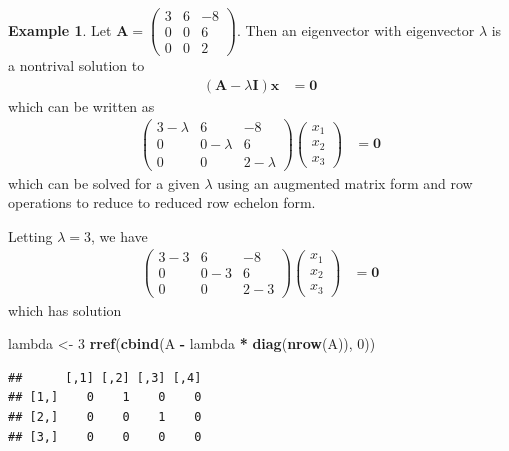 \documentclass[
]{book}
\newenvironment{Shaded}{\begin{snugshade}}{\end{snugshade}}
\newcommand{\DecValTok}[1]{\textcolor[rgb]{0.00,0.00,0.81}{#1}}
\newcommand{\KeywordTok}[1]{\textcolor[rgb]{0.13,0.29,0.53}{\textbf{#1}}}
\newcommand{\NormalTok}[1]{#1}
\newcommand{\OperatorTok}[1]{\textcolor[rgb]{0.81,0.36,0.00}{\textbf{#1}}}
\newcommand{\StringTok}[1]{\textcolor[rgb]{0.31,0.60,0.02}{#1}}
\theoremstyle{definition}
\theoremstyle{definition}
\newtheorem{example}{Example}[chapter]
\theoremstyle{definition}
\theoremstyle{definition}
\theoremstyle{remark}
\begin{document}
\begin{example}

Let \(\mathbf{A} = \begin{pmatrix} 3 & 6 & -8 \\ 0 & 0 & 6 \\ 0 & 0 & 2 \end{pmatrix}\). Then an eigenvector with eigenvector \(\lambda\) is a nontrival solution to
\[
\begin{aligned}
\left( \mathbf{A} - \lambda \mathbf{I} \right) \mathbf{x} & = \mathbf{0}
\end{aligned}
\]
which can be written as
\[
\begin{aligned}
\begin{pmatrix} 
3  - \lambda & 6 & -8 \\
0 & 0 - \lambda & 6 \\
0 & 0 & 2 - \lambda
\end{pmatrix} \begin{pmatrix} x_1 \\ x_2 \\ x_3 \end{pmatrix} & = \mathbf{0}
\end{aligned}
\]
which can be solved for a given \(\lambda\) using an augmented matrix form and row operations to reduce to reduced row echelon form.

Letting \(\lambda = 3\), we have
\[
\begin{aligned}
\begin{pmatrix} 
3  - 3 & 6 & -8 \\
0 & 0 - 3 & 6 \\
0 & 0 & 2 - 3
\end{pmatrix} \begin{pmatrix} x_1 \\ x_2 \\ x_3 \end{pmatrix} & = \mathbf{0}
\end{aligned}
\]
which has solution

\begin{Shaded}
\begin{Highlighting}[]
\NormalTok{lambda <-}\StringTok{ }\DecValTok{3}
\KeywordTok{rref}\NormalTok{(}\KeywordTok{cbind}\NormalTok{(A }\OperatorTok{-}\StringTok{ }\NormalTok{lambda }\OperatorTok{*}\StringTok{ }\KeywordTok{diag}\NormalTok{(}\KeywordTok{nrow}\NormalTok{(A)), }\DecValTok{0}\NormalTok{))}
\end{Highlighting}
\end{Shaded}

\begin{verbatim}
##      [,1] [,2] [,3] [,4]
## [1,]    0    1    0    0
## [2,]    0    0    1    0
## [3,]    0    0    0    0
\end{verbatim}

\end{example}
\end{document}
